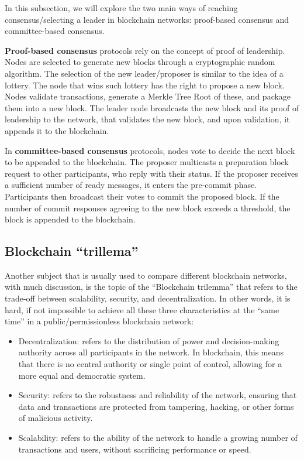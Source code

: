 In this subsection, we will explore the two main ways of reaching consensus/selecting a leader in blockchain networks: proof-based consensus and committee-based consensus.

\textbf{Proof-based consensus} protocols rely on the concept of proof of leadership. Nodes are selected to generate new blocks through a cryptographic random algorithm. The selection of the new leader/proposer is similar to the idea of a lottery. The node that wins such lottery has the right to propose a new block.
Nodes validate transactions, generate a Merkle Tree Root of these, and package them into a new block. The leader node broadcasts the new block and its proof of leadership to the network, that validates the new block, and upon validation, it appends it to the blockchain.

In \textbf{committee-based consensus} protocols, nodes vote to decide the next block to be appended to the blockchain. The proposer multicasts a preparation block request to other participants, who reply with their status. If the proposer receives a sufficient number of ready messages, it enters the pre-commit phase. Participants then broadcast their votes to commit the proposed block. If the number of commit responses agreeing to the new block exceeds a threshold, the block is appended to the blockchain.

\subsection*{Blockchain ``trillema''}

Another subject that is usually used to compare different blockchain networks, with much discussion, is the topic of the ``Blockchain trilemma'' that refers to the trade-off between scalability, security, and decentralization. 
In other words, it is hard, if not impossible to achieve all these three characteristics at the ``same time'' in a public/permissionless blockchain network:
\begin{itemize}
    \item Decentralization: refers to the distribution of power and decision-making authority across all participants in the network. In blockchain, this means that there is no central authority or single point of control, allowing for a more equal and democratic system.
    \item Security: refers to the robustness and reliability of the network, ensuring that data and transactions are protected from tampering, hacking, or other forms of malicious activity.
    \item Scalability: refers to the ability of the network to handle a growing number of transactions and users, without sacrificing performance or speed.
\end{itemize}

